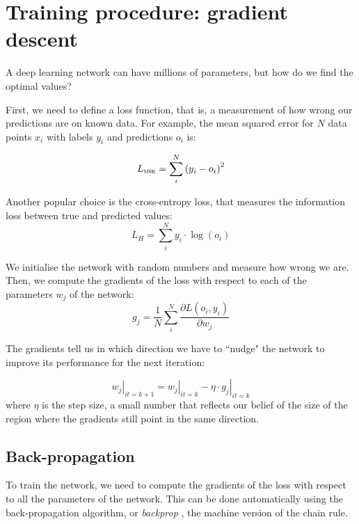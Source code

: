 \section[Gradient descent]{Training procedure: gradient descent}\label{sec:grad_descent}
A deep learning network can have millions of parameters, but how do we find the optimal values?

First, we need to define a loss function, that is, a measurement of how wrong our predictions are on known data.
For example, the mean squared error for $N$ data points  $x_i$ with labels $y_i$ and predictions $o_i$ is:

\begin{equation*}
L_{\textsc{mse}} = \sum_i^N \left(y_i - o_i\right)^2
\end{equation*}

Another popular choice is the cross-entropy loss, that measures the information loss between true and predicted values:
\begin{equation*}
L_{H} = \sum_i^N y_i \cdot \log\left(o_i\right) 
\end{equation*}

We initialise the network with random numbers and measure how wrong we are.
Then, we compute the gradients of the loss with respect to each of the parameters $w_j$ of the network:
\begin{equation*}
g_j = \frac{1}{N}\sum_i^N\frac{\partial L\left(o_i, y_i \right)}{\partial w_j}
\end{equation*}

The gradients tell us in which direction we have to ``nudge" the network to improve its performance for the next iteration:

\begin{equation*}
\left. w_j\right|_{it=k+1} = \left. w_j\right|_{it=k} - \eta \cdot \left. g_j\right|_{it=k}
\end{equation*}
where $\eta$ is the step size, a small number that reflects our belief of the size of the region where the gradients still point in the same direction.

\subsection{Back-propagation}
To train the network, we need to compute the gradients of the loss with respect to all the parameters of the network.
This can be done automatically using the back-propagation algorithm, or \emph{backprop} \citep{backprop}, the machine version of the chain rule.

